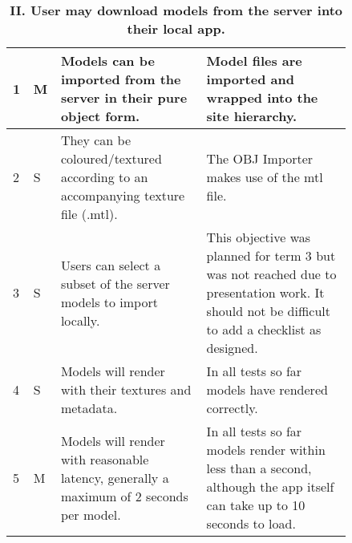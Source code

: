 \documentclass[12pt, a4paper]{article}
\newcommand{\light}[1]{\textcolor{mygrey}{#1}}
\begin{document}
\begin{table}[H]
\caption{\textbf{II. User may download models from the server into their local app.}}
\begin{tabular}{| p{0.02\linewidth} | p{0.02\linewidth} | p{0.4\linewidth} | p{0.4\linewidth} | }
\hline
1 & M & \light{Models can be imported from the server in their pure object form. } & Model files are imported and wrapped into the site hierarchy. \\ \hline
2 & S & \light{They can be coloured/textured according to an accompanying texture file (.mtl).} & The OBJ Importer makes use of the mtl file. \\ \hline
3 & S &  Users can select a subset of the server models to import locally. & This objective was planned for term 3 but was not reached due to presentation work. It should not be difficult to add a checklist as designed. \\ \hline
4 & S & \light{Models will render with their textures and metadata.} & In all tests so far models have rendered correctly. \\ \hline
5 & M & \light{Models will render with reasonable latency, generally a maximum of 2 seconds per model.} & In all tests so far models render within less than a second, although the app itself can take up to 10 seconds to load. \\ \hline
\end{tabular}
\label{table:obj2}
\end{table}
\end{document}
